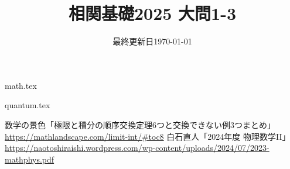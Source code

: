 \documentclass{jlreq}
\title{相関基礎2025 大問1-3}
\author{\emoji{deciduous-tree}}
\date{最終更新日\today }
\begin{document}
\maketitle
  
{math.tex}

\pagebreak

{quantum.tex}
  
\begin{thebibliography}{99}
    数学の景色「極限と積分の順序交換定理6つと交換できない例3つまとめ」\url{https://mathlandscape.com/limit-int/#toc8}
    白石直人「2024年度 物理数学II」\url{https://naotoshiraishi.wordpress.com/wp-content/uploads/2024/07/2023-mathphys.pdf}
\end{thebibliography}
  
\end{document}
